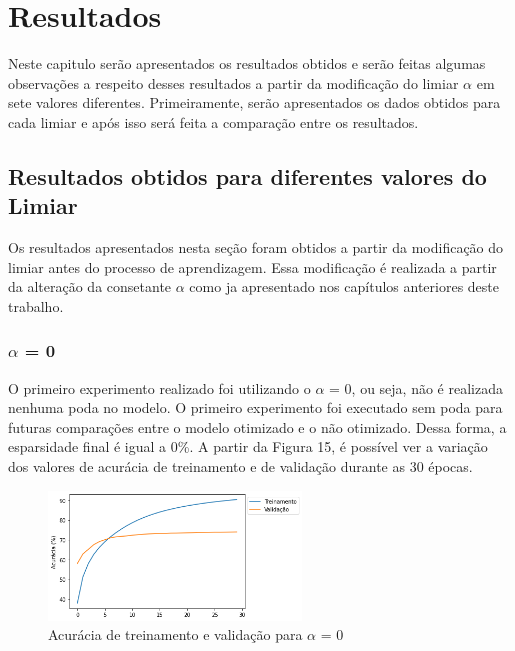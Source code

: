 \chapter[Resultados]{Resultados}
\label{ch:cap4}

Neste capitulo serão apresentados os resultados obtidos e serão feitas algumas observações a respeito desses resultados a partir da modificação do limiar $\alpha$ em sete valores diferentes. Primeiramente, serão apresentados os dados obtidos para cada limiar e após isso será feita a comparação entre os resultados.

\section{Resultados obtidos para diferentes valores do Limiar}
Os resultados apresentados nesta seção foram obtidos a partir da modificação do limiar antes do processo de aprendizagem. Essa modificação é realizada a partir da alteração da consetante $\alpha$ como ja apresentado nos capítulos anteriores deste trabalho.


\subsection{$\alpha$ = 0}
O primeiro experimento realizado foi utilizando o $\alpha$ = 0, ou seja, não é realizada nenhuma poda no modelo. O primeiro experimento foi executado sem poda para futuras comparações entre o modelo otimizado e o não otimizado. Dessa forma, a esparsidade final é igual a 0\%. A partir da Figura 15, é possível ver a variação dos valores de acurácia de treinamento e de validação durante as 30 épocas.

\begin{figure}[H]
	\includegraphics[width=0.6\textwidth, keepaspectratio=true]{figuras/CAP4/acuracia0.png}
	\centering
	\caption[Acurácia de treinamento e validação para $\alpha$ = 0]{Acurácia de treinamento e validação para $\alpha$ = 0}
\end{figure}

